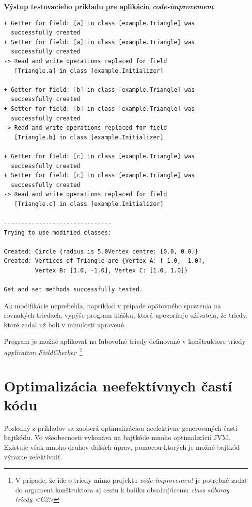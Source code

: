 \documentclass[11pt,final,oneside]{fithesis}
\newenvironment{example}[1]
{
\vspace{3mm}
\noindent\textbf{#1}
\vspace{2mm}
}
{
\vspace{3mm}
}
\begin{document}
\begin{example}{Výstup testovacieho príkladu pre aplikáciu \textit{code-improvement}}
\begin{verbatim}
+ Getter for field: [a] in class [example.Triangle] was
  successfully created
+ Setter for field: [a] in class [example.Triangle] was
  successfully created
-> Read and write operations replaced for field
   [Triangle.a] in class [example.Initializer]

+ Getter for field: [b] in class [example.Triangle] was
  successfully created
+ Setter for field: [b] in class [example.Triangle] was
  successfully created
-> Read and write operations replaced for field
   [Triangle.b] in class [example.Initializer]

+ Getter for field: [c] in class [example.Triangle] was
  successfully created
+ Setter for field: [c] in class [example.Triangle] was
  successfully created
-> Read and write operations replaced for field
   [Triangle.c] in class [example.Initializer]

-------------------------------
Trying to use modified classes: 

Created: Circle {radius is 5.0Vertex centre: [0.0, 0.0]}
Created: Vertices of Triangle are {Vertex A: [-1.0, -1.0],
         Vertex B: [1.0, -1.0], Vertex C: [1.0, 1.0]}

Get and set methods successfully tested.
\end{verbatim}
\end{example}

Ak modifikácie neprebehla, napríklad v prípade opätovného spustenia na rovnakých triedach, vypýše program hlášku, ktorá upozorňuje užívateľa, že triedy, ktoré zadal už boli v minulosti upravené.

Program je možné aplikovať na ľubovoľné triedy definované v konštruktore triedy \textit{application.FieldChecker}~\footnote{V prípade, že ide o triedy mimo projektu \textit{code-improvement} je potrebné zadať do argument konštruktora aj cestu k balíku obsahujúcemu \textit{class súboroy triedy <C2>}}

\section{Optimalizácia neefektívnych častí kódu}
Posledný z príkladov sa zaoberá optimalizáciou neefektívne generovaných častí bajtkódu. Vo všeobecnosti vykonáva na bajtkóde mnoho optimalizácií JVM. Existuje však mnoho druhov ďalších úprav, pomocou ktorých je možné bajtkód výrazne zefektívniť.
\end{document}

